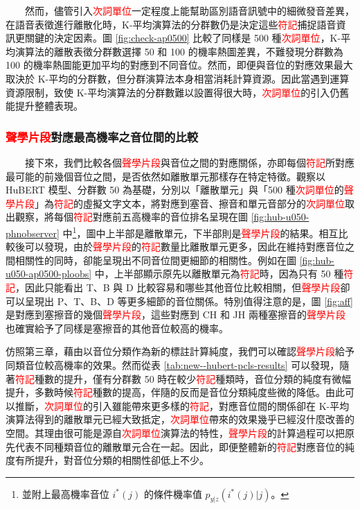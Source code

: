 　　然而，儘管引入\textcolor{red}{次詞單位}一定程度上能幫助區別語音訊號中的細微發音差異，在語音表徵進行離散化時，K-平均演算法的分群數仍是決定這些\textcolor{red}{符記}捕捉語音資訊更關鍵的決定因素。圖 \ref{fig:check-ap0500} 比較了同樣是 500 種\textcolor{red}{次詞單位}，K-平均演算法的離散表徵分群數選擇 50 和 100 的機率熱圖差異，不難發現分群數為 100 的機率熱圖能更加平均的對應到不同音位。然而，即便與音位的對應效果最大取決於 K-平均的分群數，但分群演算法本身相當消耗計算資源。因此當遇到運算資源限制，致使 K-平均演算法的分群數難以設置得很大時，\textcolor{red}{次詞單位}的引入仍舊能提升整體表現。

\subsubsection{\textcolor{red}{聲學片段}對應最高機率之音位間的比較}

　　接下來，我們比較各個\textcolor{red}{聲學片段}與音位之間的對應關係，亦即每個\textcolor{red}{符記}所對應最可能的前幾個音位之間，是否依然如離散單元那樣存在特定特徵。觀察以 HuBERT 模型、分群數 50 為基礎，分別以「離散單元」與「500 種\textcolor{red}{次詞單位}的\textcolor{red}{聲學片段}」為\textcolor{red}{符記}的虛擬文字文本，將對應到塞音、擦音和單元音部分的\textcolor{red}{次詞單位}取出觀察，將每個\textcolor{red}{符記}對應前五高機率的音位排名呈現在圖 \ref{fig:hub-u050-phnobserver} 中\footnote{並附上最高機率音位 $i^*(j)$ 的條件機率值 $p_{y|z}(i^*(j)|j)$。}，圖中上半部是離散單元，下半部則是\textcolor{red}{聲學片段}的結果。相互比較後可以發現，由於\textcolor{red}{聲學片段}的\textcolor{red}{符記}數量比離散單元更多，因此在維持對應音位之間相關性的同時，卻能呈現出不同音位間更細節的相關性。例如在圖 \ref{fig:hub-u050-ap0500-ploobs} 中，上半部顯示原先以離散單元為\textcolor{red}{符記}時，因為只有 50 種\textcolor{red}{符記}，因此只能看出 T、B 與 D 比較容易和哪些其他音位比較相關，但\textcolor{red}{聲學片段}卻可以呈現出 P、T、B、D 等更多細節的音位關係。特別值得注意的是，圖 \ref{fig:aff} 是對應到塞擦音的幾個\textcolor{red}{聲學片段}，這些對應到 CH 和 JH 兩種塞擦音的\textcolor{red}{聲學片段}也確實給予了同樣是塞擦音的其他音位較高的機率。

        仿照第三章，藉由以音位分類作為新的標註計算純度，我們可以確認\textcolor{red}{聲學片段}給予同類音位較高機率的效果。然而從表 \ref{tab:new--hubert-pcls-results} 可以發現，隨著\textcolor{red}{符記}種數的提升，僅有分群數 50 時在較少\textcolor{red}{符記}種類時，音位分類的純度有微幅提升，多數時候\textcolor{red}{符記}種數的提高，伴隨的反而是音位分類純度些微的降低。由此可以推斷，\textcolor{red}{次詞單位}的引入雖能帶來更多樣的\textcolor{red}{符記}，對應音位間的關係卻在 K-平均演算法得到的離散單元已經大致抵定，\textcolor{red}{次詞單位}帶來的效果幾乎已經沒什麼改善的空間。其理由很可能是源自\textcolor{red}{次詞單位}演算法的特性，\textcolor{red}{聲學片段}的計算過程可以把原先代表不同種類音位的離散單元合在一起。因此，即便整體新的\textcolor{red}{符記}對應音位的純度有所提升，對音位分類的相關性卻低上不少。

